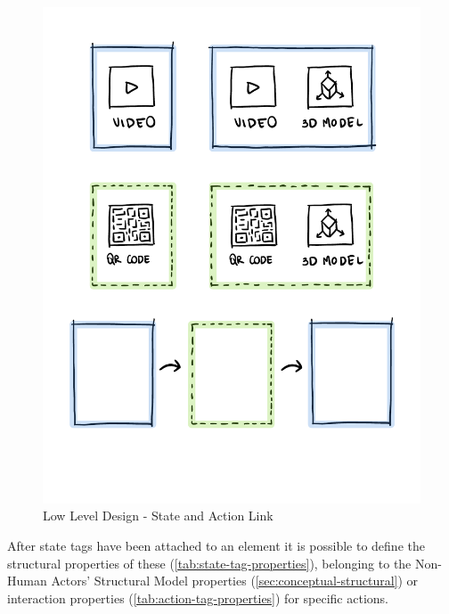 \begin{figure}[h]
    \centering
    \includegraphics[width=\textwidth]{Figures/Editor/wireframes/SaSlinks.png}
    \caption{Low Level Design - State and Action Link}
    \label{fig:sasLink}
\end{figure}

After state tags have been attached to an element it is possible to define the structural properties of these (\autoref{tab:state-tag-properties}), belonging to the Non-Human Actors' Structural Model properties (\autoref{sec:conceptual-structural}) or interaction properties (\autoref{tab:action-tag-properties}) for specific actions.

